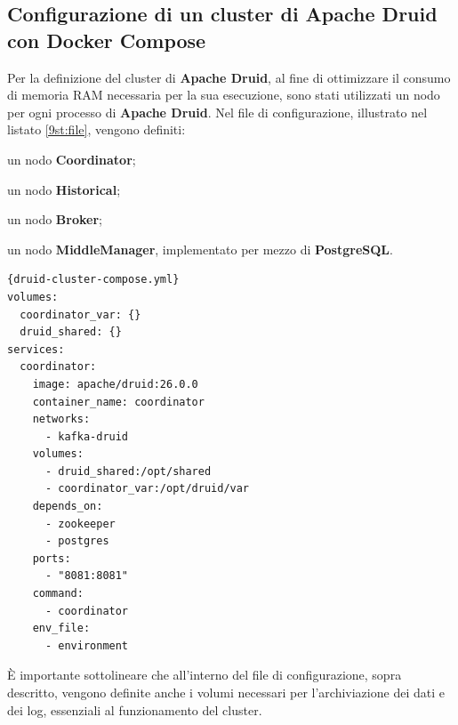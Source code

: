 \subsection{Configurazione di un cluster di Apache Druid con Docker Compose}
Per la definizione del \gls{cluster}{} di \textbf{Apache Druid},
al fine di ottimizzare il consumo di memoria RAM necessaria per la sua esecuzione,
sono stati utilizzati un nodo per ogni processo di \textbf{Apache Druid}.
Nel file di configurazione, illustrato nel listato \ref{9st:file}, vengono definiti:
\begin{list}{*}
  \item  un nodo \textbf{Coordinator};
  \item \item  un nodo \textbf{Historical};
  \item  un nodo \textbf{Broker}; 
  \item  un nodo \textbf{MiddleManager}, implementato per mezzo di \textbf{PostgreSQL}.
\end{list} 
\pagebreak
\begin{lstlisting}[caption=\texttt{druid-cluster-compose.yml}, label=9st:file]{druid-cluster-compose.yml}
volumes:
  coordinator_var: {}
  druid_shared: {}
services:
  coordinator:
    image: apache/druid:26.0.0
    container_name: coordinator
    networks:
      - kafka-druid
    volumes:
      - druid_shared:/opt/shared
      - coordinator_var:/opt/druid/var
    depends_on:
      - zookeeper
      - postgres
    ports:
      - "8081:8081"
    command:
      - coordinator
    env_file:
      - environment
\end{lstlisting}
È importante sottolineare che all'interno del file di configurazione, sopra descritto, vengono definite anche 
i \gls{volumi}{} necessari per l'archiviazione dei dati e dei \gls{log}{}, essenziali al funzionamento del \gls{cluster}{}.
